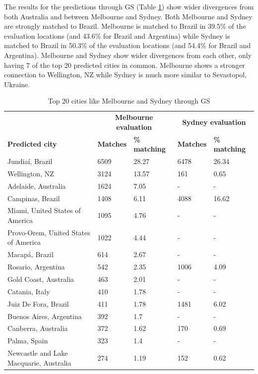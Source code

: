 \documentclass[sageh,times]{sagej}
\begin{document}
The results for the predictions through GS (Table \ref{tab:melbournesydneyGS}) show wider divergences from both Australia and between Melbourne and Sydney. Both Melbourne and Sydney are strongly matched to Brazil. Melbourne is matched to Brazil in 39.5\% of the evaluation locations (and 43.6\% for Brazil and Argentina) while Sydney is matched to Brazil in 50.3\% of the evaluation locations (and 54.4\% for Brazil and Argentina). Melbourne and Sydney show wider divergences from each other, only having 7 of the top 20 predicted cities in common. Melbourne shows a stronger connection to Wellington, NZ while Sydney is much more similar to Sevastopol, Ukraine.

\begin{table}[!htbp]
\caption{Top 20 cities like Melbourne and Sydney through GS \label{tab:melbournesydneyGS}}     
\begin{tabular}{| l | l |l| l | l|}
 \hline    &  \multicolumn{2}{c|}{\textbf{Melbourne evaluation}} & \multicolumn{2}{c|}{\textbf{Sydney evaluation}}  \\  
\textbf{Predicted city} & \textbf{Matches} & \textbf{\% matching}  & \textbf{Matches} & \textbf{\% matching}\\ \hline
Jundia\'{i}, Brazil & 6509 & 28.27 & 6478 & 26.34 \\ \hline
Wellington, NZ & 3124 & 13.57 & 161 & 0.65 \\ \hline
Adelaide, Australia & 1624 & 7.05 &-&- \\ \hline
Campinas, Brazil & 1408 & 6.11 & 4088 & 16.62 \\ \hline
Miami, United States of America & 1095 & 4.76 &-&- \\ \hline
Provo-Orem, United States of America & 1022 & 4.44 &-&- \\ \hline
Macap\'{a}, Brazil & 614 & 2.67 &-&- \\ \hline
Rosario, Argentina & 542 & 2.35 & 1006 & 4.09 \\ \hline
Gold Coast, Australia & 463 & 2.01 &-&- \\ \hline
Catania, Italy & 410 & 1.78 &-&- \\ \hline
Juiz De Fora, Brazil & 411 & 1.78 & 1481 & 6.02 \\ \hline
Buenos Aires, Argentina & 392 & 1.7 &-&- \\ \hline
Canberra, Australia & 372 & 1.62 & 170 & 0.69 \\ \hline
Palma, Spain & 323 & 1.4 &-&- \\ \hline
Newcastle and Lake Macquarie, Australia & 274 & 1.19 & 152 & 0.62 \\ \hline

\end{tabular}
\end{table}
\end{document}

